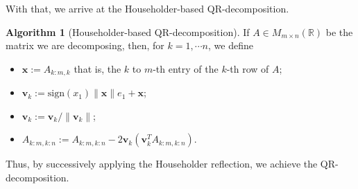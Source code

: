 \documentclass[
]{article}
\theoremstyle{definition}
\newtheorem{alg}{Algorithm}
\theoremstyle{definition}
\begin{document}
With that, we arrive at the Householder-based QR-decomposition.

\begin{alg}[Householder-based QR-decomposition]
  If \(A \in M_{m \times n}(\mathbb{R})\) be the matrix we are decomposing, then,
  for \(k = 1,\cdots n\), we define 
  \begin{itemize}
    \item \(\mathbf{x} := A_{k : m, k}\) that is, the \(k\) to \(m\)-th 
      entry of the \(k\)-th row of \(A\);
    \item \(\mathbf{v}_k := \text{sign}(x_1) \| \mathbf{x} \|e_1 + \mathbf{x}\);
    \item \(\mathbf{v}_k := \mathbf{v}_k / \| \mathbf{v}_k \|\);
    \item \(A_{k:m, k:n} := A_{k:m, k:n} - 2\mathbf{v}_k(\mathbf{v}_k^T A_{k:m, k:n})\).
  \end{itemize}

\end{alg}

Thus, by successively applying the Householder reflection, we achieve
the QR-decomposition.
\end{document}
